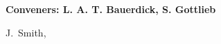 

\begin{center}

\begin{large} {\bf Conveners: L. A. T. Bauerdick, S. Gottlieb} \end{large}

J.~Smith, 

\end{center}

